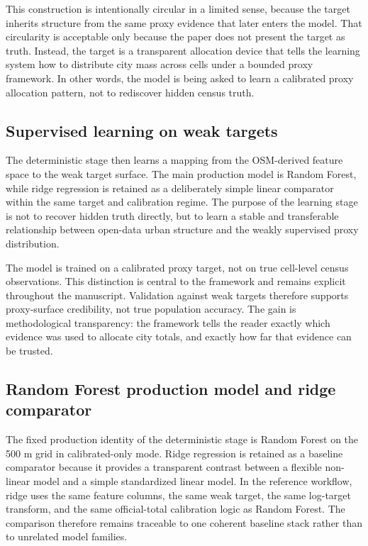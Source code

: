 This construction is intentionally circular in a limited sense, because the target inherits structure from the same proxy evidence that later enters the model. That circularity is acceptable only because the paper does not present the target as truth. Instead, the target is a transparent allocation device that tells the learning system how to distribute city mass across cells under a bounded proxy framework. In other words, the model is being asked to learn a calibrated proxy allocation pattern, not to rediscover hidden census truth.

\subsection{Supervised learning on weak targets}

The deterministic stage then learns a mapping from the OSM-derived feature space to the weak target surface. The main production model is Random Forest, while ridge regression is retained as a deliberately simple linear comparator within the same target and calibration regime. The purpose of the learning stage is not to recover hidden truth directly, but to learn a stable and transferable relationship between open-data urban structure and the weakly supervised proxy distribution.

The model is trained on a calibrated proxy target, not on true cell-level census observations. This distinction is central to the framework and remains explicit throughout the manuscript. Validation against weak targets therefore supports proxy-surface credibility, not true population accuracy. The gain is methodological transparency: the framework tells the reader exactly which evidence was used to allocate city totals, and exactly how far that evidence can be trusted.

\subsection{Random Forest production model and ridge comparator}

The fixed production identity of the deterministic stage is Random Forest on the 500 m grid in calibrated-only mode. Ridge regression is retained as a baseline comparator because it provides a transparent contrast between a flexible non-linear model and a simple standardized linear model. In the reference workflow, ridge uses the same feature columns, the same weak target, the same log-target transform, and the same official-total calibration logic as Random Forest. The comparison therefore remains traceable to one coherent baseline stack rather than to unrelated model families.

